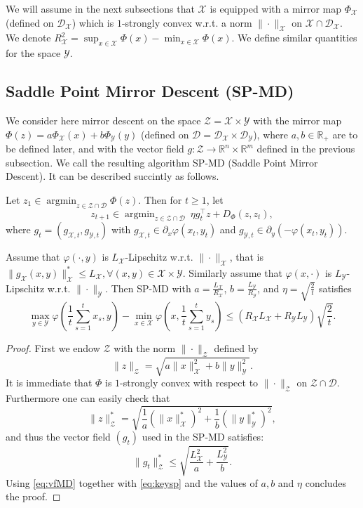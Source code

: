 \documentclass[openany]{now}
\renewcommand{\phi}{\varphi}
\newcommand{\R}{\mathbb{R}}
\newcommand{\cZ}{\mathcal{Z}}
\newcommand{\cX}{\mathcal{X}}
\newcommand{\cY}{\mathcal{Y}}
\newcommand{\cD}{\mathcal{D}}
\newcommand{\argmin}{\mathop{\mathrm{argmin}}}
\begin{document}
We will assume in the next subsections that $\cX$ is equipped with a mirror map $\Phi_{\cX}$ (defined on $\cD_{\cX}$) which is $1$-strongly convex w.r.t. a norm $\|\cdot\|_{\cX}$ on $\cX \cap \cD_{\cX}$. We denote $R^2_{\cX} = \sup_{x \in \cX} \Phi(x) - \min_{x \in \cX} \Phi(x)$. We define similar quantities for the space $\cY$.

\subsection{Saddle Point Mirror Descent (SP-MD)} \label{sec:spmd}
We consider here mirror descent on the space $\cZ = \cX \times \cY$ with the mirror map $\Phi(z) = a \Phi_{\cX}(x) + b \Phi_{\cY}(y)$ (defined on $\cD = \cD_{\cX} \times \cD_{\cY}$), where $a, b \in \R_+$ are to be defined later, and with the vector field $g : \cZ \rightarrow \R^n \times \R^m$ defined in the previous subsection. We call the resulting algorithm SP-MD (Saddle Point Mirror Descent). It can be described succintly as follows.

Let $z_1 \in \argmin_{z \in \cZ \cap \cD} \Phi(z)$. Then for $t \geq 1$, let
$$z_{t+1} \in \argmin_{z \in \cZ \cap \cD} \ \eta g_t^{\top} z + D_{\Phi}(z,z_t) ,$$
where $g_t = (g_{\cX,t}, g_{\cY,t})$ with $g_{\cX,t} \in \partial_x \phi(x_t,y_t)$ and $g_{\cY,t} \in \partial_y (- \phi(x_t,y_t))$.

\begin{theorem} \label{th:spmd}
Assume that $\phi(\cdot, y)$ is $L_{\cX}$-Lipschitz w.r.t. $\|\cdot\|_{\cX}$, that is $\|g_{\cX}(x,y)\|_{\cX}^* \leq L_{\cX}, \forall (x, y) \in \cX \times \cY$. Similarly assume that $\phi(x, \cdot)$ is $L_{\cY}$-Lipschitz w.r.t. $\|\cdot\|_{\cY}$. Then SP-MD with $a= \frac{L_{\cX}}{R_{\cX}}$, $b=\frac{L_{\cY}}{R_{\cY}}$, and $\eta=\sqrt{\frac{2}{t}}$ satisfies
$$\max_{y \in \mathcal{Y}} \phi\left( \frac1{t} \sum_{s=1}^t x_s,y \right) - \min_{x \in \mathcal{X}} \phi\left(x, \frac1{t} \sum_{s=1}^t y_s \right) \leq (R_{\cX} L_{\cX} + R_{\cY} L_{\cY}) \sqrt{\frac{2}{t}}.$$
\end{theorem}

\begin{proof}
First we endow $\mathcal{Z}$ with the norm $\|\cdot\|_{\cZ}$ defined by
$$\|z\|_{\cZ} = \sqrt{a \|x\|_{\mathcal{X}}^2 + b \|y\|_{\mathcal{Y}}^2} .$$
It is immediate that $\Phi$ is $1$-strongly convex with respect to $\|\cdot\|_{\mathcal{Z}}$ on $\mathcal{Z} \cap \mathcal{D}$. Furthermore one can easily check that
$$\|z\|_{\mathcal{Z}}^* = \sqrt{\frac1{a} \left(\|x\|_{\mathcal{X}}^*\right)^2 + \frac1{b} \left(\|y\|_{\mathcal{Y}}^*\right)^2} ,$$
and thus the vector field $(g_t)$ used in the SP-MD satisfies:
$$\|g_t\|_{\mathcal{Z}}^* \leq \sqrt{\frac{L_{\mathcal{X}}^2}{a} + \frac{L_{\mathcal{Y}}^2}{b}} .$$
Using \eqref{eq:vfMD} together with \eqref{eq:keysp} and the values of $a, b$ and $\eta$ concludes the proof.
\end{proof}
\end{document}
